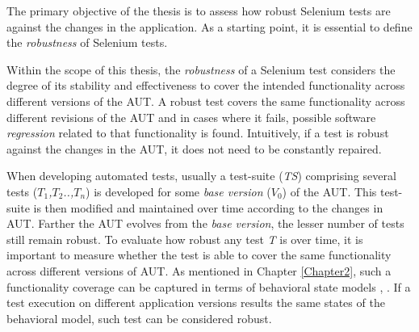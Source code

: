 The primary objective of the thesis is to assess how robust Selenium tests are against the changes in the application. As a starting point, it is essential to define the \textit{robustness} of Selenium tests. 

Within the scope of this thesis, the \textit{robustness} of a Selenium test considers the degree of its stability and effectiveness to cover the intended functionality across different versions of the AUT. A robust test covers the same functionality across different revisions of the AUT and in cases where it fails, possible software \textit{regression} related to that functionality is found. Intuitively, if a test is robust against the changes in the AUT, it does not need to be constantly repaired.



  


When developing automated tests, usually a test-suite (\textit{TS}) comprising several tests (\textit{$T_1$,$T_2$..,$T_n$}) is developed for some \textit{base version} (\textit{$V_{0}$}) of the AUT. This test-suite is then modified and maintained over time according to the changes in AUT. Farther the AUT evolves from the \textit{base version}, the lesser number of tests still remain robust. To evaluate how robust any test \textit{T} is over time, it is important to measure whether the test is able to cover the same functionality across different versions of AUT. As mentioned in Chapter \ref{Chapter2}, such a functionality coverage can be captured in terms of behavioral state models \cite{marchettoStateBased}, \cite{SchurMiningBehavModels}. If a test execution on different application versions results the same states of the behavioral model, such test can be considered robust.

